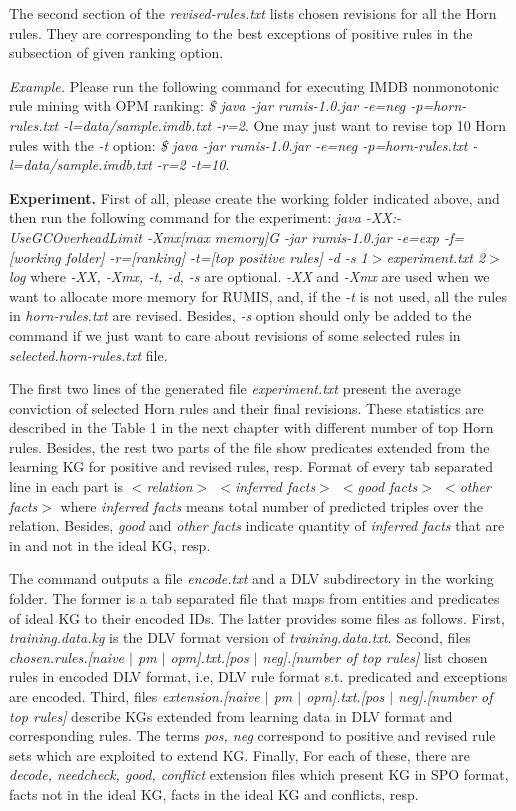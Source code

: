 The second section of the \textit{revised-rules.txt} lists chosen revisions for all the Horn rules. They are corresponding to the best exceptions of positive rules in the subsection of given ranking option.

\textit{Example.} Please run the following command for executing IMDB nonmonotonic rule mining with OPM ranking: \textit{\$ java -jar rumis-1.0.jar -e=neg -p=horn-rules.txt -l=data/sample.imdb.txt -r=2}. One may just want to revise top 10 Horn rules with the \textit{-t} option: \textit{\$ java -jar rumis-1.0.jar -e=neg -p=horn-rules.txt -l=data/sample.imdb.txt -r=2 -t=10}.

\textbf{Experiment.} First of all, please create the working folder indicated above, and then run the following command for the experiment: \textit{java -XX:-UseGCOverheadLimit -Xmx[max memory]G -jar rumis-1.0.jar -e=exp -f=[working folder] -r=[ranking] -t=[top positive rules] -d -s 1$>$experiment.txt 2$>$log} where \textit{-XX, -Xmx, -t, -d, -s} are optional. \textit{-XX} and \textit{-Xmx} are used when we want to allocate more memory for RUMIS, and, if the \textit{-t} is not used, all the rules in \textit{horn-rules.txt} are revised. Besides, \textit{-s} option should only be added to the command if we just want to care about revisions of some selected rules in \textit{selected.horn-rules.txt} file.

The first two lines of the generated file \textit{experiment.txt} present the average conviction of selected Horn rules and their final revisions. These statistics are described in the Table 1 in the next chapter with different number of top Horn rules. Besides, the rest two parts of the file show predicates extended from the learning KG for positive and revised rules, resp. Format of every tab separated line in each part is \textit{$<$relation$>$ $<$inferred facts$>$ $<$good facts$>$ $<$other facts$>$} where \textit{inferred facts} means total number of predicted triples over the relation. Besides, \textit{good} and \textit{other facts} indicate quantity of \textit{inferred facts} that are in and not in the ideal KG, resp.

The command outputs a file \textit{encode.txt} and a DLV subdirectory in the working folder. The former is a tab separated file that maps from entities and predicates of ideal KG to their encoded IDs. The latter provides some files as follows. First, \textit{training.data.kg} is the DLV format version of \textit{training.data.txt}. Second, files \textit{chosen.rules.[naive $|$ pm $|$ opm].txt.[pos $|$ neg].[number of top rules]} list chosen rules in encoded DLV format, i.e, DLV rule format s.t. predicated and exceptions are encoded. Third, files \textit{extension.[naive $|$ pm $|$ opm].txt.[pos $|$ neg].[number of top rules]} describe KGs extended from learning data in DLV format and corresponding rules. The terms \textit{pos, neg} correspond to positive and revised rule sets which are exploited to extend KG. Finally, For each of these, there are \textit{decode, needcheck, good, conflict} extension files which present KG in SPO format, facts not in the ideal KG, facts in the ideal KG and conflicts, resp.

